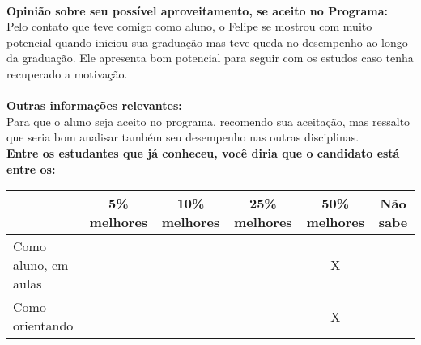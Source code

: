 \documentclass[11pt]{article}
\begin{document}
\\
\textbf{Opinião sobre seu possível aproveitamento, se aceito no Programa:}
\\Pelo contato que teve comigo como aluno, o Felipe se mostrou com muito potencial quando iniciou sua graduação mas teve queda no desempenho ao longo da graduação. Ele apresenta bom potencial para seguir com os estudos caso tenha recuperado a motivação.\\ 
\\
\textbf{Outras informações relevantes:} \\Para que o aluno seja aceito no programa, recomendo sua aceitação, mas ressalto que seria bom analisar também seu desempenho nas outras disciplinas.
\\[0.3cm]
\textbf{Entre os estudantes que já conheceu, você diria que o candidato está entre os:}
\\
\begin{tabular}{|l|c|c|c|c|c|}
\hline
 & 5\% melhores & 10\% melhores & 25\% melhores & 50\% melhores & Não sabe \\
\hline
Como aluno, em aulas &  &  &  & X & \\
\hline
Como orientando &  &  &  & X & \\
\hline
\end{tabular}
\end{document}
